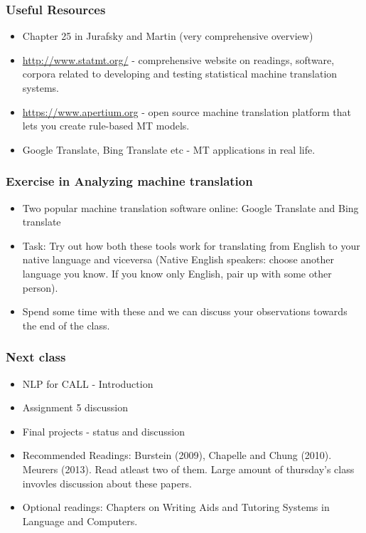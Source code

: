 \documentclass{beamer}
\begin{document}
\begin{frame}
\frametitle{Useful Resources}
\begin{itemize}
\item Chapter 25 in Jurafsky and Martin (very comprehensive overview)
\item \url{http://www.statmt.org/} - comprehensive website on readings, software, corpora related to developing and testing statistical machine translation systems.
\item \url{https://www.apertium.org} - open source machine translation platform that lets you create rule-based MT models.
\item Google Translate, Bing Translate etc - MT applications in real life.
\end{itemize}
\end{frame}

\begin{frame}
\frametitle{Exercise in Analyzing machine translation}
\begin{itemize}
\item Two popular machine translation software online: Google Translate and Bing translate
\item Task: Try out how both these tools work for translating from English to your native language and viceversa (Native English speakers: choose another language you know. If you know only English, pair up with some other person).
\item Spend some time with these and we can discuss your observations towards the end of the class.
\end{itemize}
\end{frame}

\begin{frame}
\frametitle{Next class}
\begin{itemize}
\item NLP for CALL - Introduction
\item Assignment 5 discussion
\item Final projects - status and discussion 
\item Recommended Readings: Burstein (2009), Chapelle and Chung (2010). Meurers (2013). Read atleast two of them. Large amount of thursday's class invovles discussion about these papers. 
\item Optional readings: Chapters on Writing Aids and Tutoring Systems in Language and Computers.
\end{itemize}
\end{frame}
\end{document}
